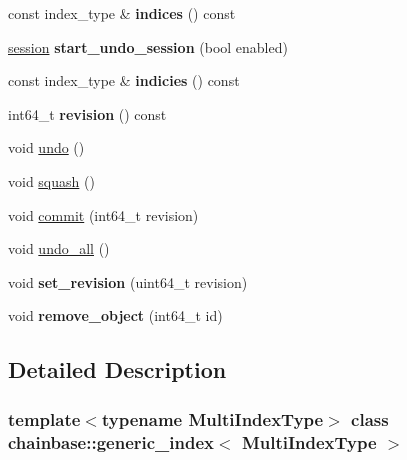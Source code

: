 \begin{DoxyCompactItemize}
const index\+\_\+type \& {\bfseries indices} () const
\item 
\mbox{\label{classchainbase_1_1generic__index_acd481aa23b43c4b5d3c002c79267b3a0}} 
\mbox{\hyperlink{classchainbase_1_1generic__index_1_1session}{session}} {\bfseries start\+\_\+undo\+\_\+session} (bool enabled)
\item 
\mbox{\label{classchainbase_1_1generic__index_ad50393e3cad8a2735f47e6683c3d2990}} 
const index\+\_\+type \& {\bfseries indicies} () const
\item 
\mbox{\label{classchainbase_1_1generic__index_a10e52af21c940241c3f38fb69ccf0d8d}} 
int64\+\_\+t {\bfseries revision} () const
\item 
void \mbox{\hyperlink{classchainbase_1_1generic__index_a7b8c6268b527bcf7d7b6428ed769d612}{undo}} ()
\item 
void \mbox{\hyperlink{classchainbase_1_1generic__index_a3ce42fec04c9d19c0f1c72f95e448bc3}{squash}} ()
\item 
void \mbox{\hyperlink{classchainbase_1_1generic__index_a5e23184f8b0100dbfdc0422bd21093fd}{commit}} (int64\+\_\+t revision)
\item 
void \mbox{\hyperlink{classchainbase_1_1generic__index_a63ac021eb91a0607ac3c28ebf92fb082}{undo\+\_\+all}} ()
\item 
\mbox{\label{classchainbase_1_1generic__index_a683cb95802382404ba05c574e3729d80}} 
void {\bfseries set\+\_\+revision} (uint64\+\_\+t revision)
\item 
\mbox{\label{classchainbase_1_1generic__index_ae7020d1a7d4eca6b89d33aa60f9d040a}} 
void {\bfseries remove\+\_\+object} (int64\+\_\+t id)
\end{DoxyCompactItemize}


\subsection{Detailed Description}
\subsubsection*{template$<$typename Multi\+Index\+Type$>$\newline
class chainbase\+::generic\+\_\+index$<$ Multi\+Index\+Type $>$}

